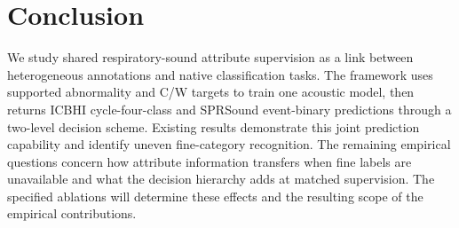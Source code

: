\section{Conclusion}
\label{sec:conclusion}
We study shared respiratory-sound attribute supervision as a link between
heterogeneous annotations and native classification tasks. The framework
uses supported abnormality and C/W targets to train one acoustic model,
then returns ICBHI cycle-four-class and SPRSound event-binary predictions
through a two-level decision scheme. Existing results demonstrate this
joint prediction capability and identify uneven fine-category recognition.
The remaining empirical questions concern how attribute information transfers
when fine labels are unavailable and what the decision hierarchy adds at
matched supervision. The specified ablations will determine these effects
and the resulting scope of the empirical contributions.
